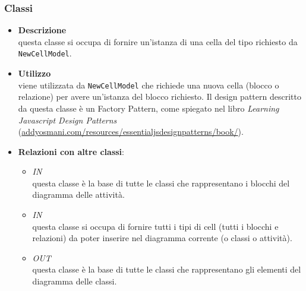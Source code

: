 \subsubsection{Classi}
\label{\nogloxy{swedesigner::client::model::NewCellFactory}}
\begin{itemize}
\item \textbf{Descrizione}\\
questa classe si occupa di fornire un'istanza di una cella del tipo richiesto da \texttt{NewCellModel}. 
\item \textbf{Utilizzo}\\
viene utilizzata da \texttt{NewCellModel} che richiede una nuova cella (blocco o relazione) per avere un'istanza del blocco richiesto. Il design pattern descritto da questa classe è un Factory Pattern, come spiegato nel libro \emph{Learning Javascript Design Patterns} (\url{addyosmani.com/resources/essentialjsdesignpatterns/book/}).
\item \textbf{Relazioni con altre classi}:
\begin{itemize}
\item \textit{IN} \hyperref[\nogloxy{swedesigner::client::model::celltypes::activity::ActivityDiagramElement}]{}\\
questa classe è la base di tutte le classi che rappresentano i blocchi del diagramma delle attività.
\item \textit{IN} \hyperref[\nogloxy{swedesigner::client::model::NewCellModel}]{}\\
questa classe si occupa di fornire tutti i tipi di cell (tutti i blocchi e relazioni) da poter inserire nel diagramma corrente (o classi o attività).
\item \textit{OUT} \hyperref[\nogloxy{swedesigner::client::model::celltypes::class::ClassDiagramElement}]{}\\
questa classe è la base di tutte le classi che rappresentano gli elementi del diagramma delle classi.
\end{itemize}
\end{itemize}

